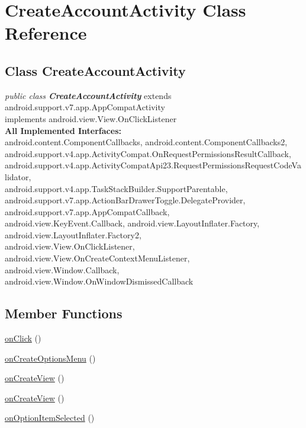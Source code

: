 
\hypertarget{class_CreateAccountActivity.Android}{\section{CreateAccountActivity Class Reference}
\label{class_CreateAccountActivity.Android}
}

\subsection*{Class CreateAccountActivity}

\textit{public class \textbf{CreateAccountActivity}}
	extends android.support.v7.app.AppCompatActivity\\
	implements android.view.View.OnClickListener\\




\textbf{All Implemented Interfaces:}\\
\tab        android.content.ComponentCallbacks, android.content.ComponentCallbacks2, \\
android.support.v4.app.ActivityCompat.OnRequestPermissionsResultCallback, \\
android.support.v4.app.ActivityCompatApi23.RequestPermissionsRequestCodeValidator, \\
android.support.v4.app.TaskStackBuilder.SupportParentable,\\
 android.support.v7.app.ActionBarDrawerToggle.DelegateProvider, android.support.v7.app.AppCompatCallback,\\
  android.view.KeyEvent.Callback, android.view.LayoutInflater.Factory, android.view.LayoutInflater.Factory2, \\
  android.view.View.OnClickListener, android.view.View.OnCreateContextMenuListener, android.view.Window.Callback,\\
   android.view.Window.OnWindowDismissedCallback\\

\subsection*{Member Functions}
\begin{DoxyCompactItemize}
\item 
\hyperlink{class_CreateAccountActivity.Android.onClick}{onClick} ()
\item 
\hyperlink{class_CreateAccountActivity.Android.onCreateOptionsMenu}{onCreateOptionsMenu} ()
\item 
\hyperlink{class_CreateAccountActivity.Android.onCreateView}{onCreateView} ()
\item 
\hyperlink{class_CreateAccountActivity.Android.onCreateView2}{onCreateView} ()
\item 
\hyperlink{class_CreateAccountActivity.Android.onOptionsItemSelected}{onOptionItemSelected} ()

\end{DoxyCompactItemize}




